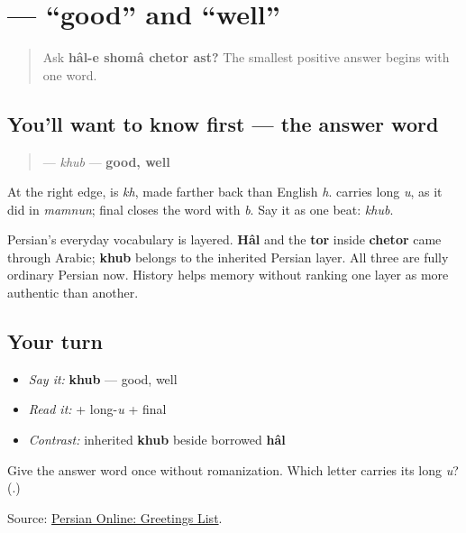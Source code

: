 \section[\texorpdfstring{\fa{خوب} (khub)}{خوب (khub)}]{ — “good” and “well”}

\label{lesson:FA-C04-khub}



\begin{quote}
Ask \textbf{hâl-e shomâ chetor ast?} The smallest positive answer begins with one word.
\end{quote}

\subsection*{You'll want to know first — the answer word}
\begin{quote}
\textbf{} — \emph{khub} — \textbf{good, well}
\end{quote}

At the right edge, \textbf{} is \emph{kh}, made farther back than English \emph{h}. \textbf{} carries long \emph{u}, as it did in \emph{mamnun}; final \textbf{} closes the word with \emph{b}. Say it as one beat: \emph{khub}.

\begin{cousinweb}
Persian's everyday vocabulary is layered. \textbf{Hâl} and the \textbf{tor} inside \textbf{chetor} came through Arabic; \textbf{khub} belongs to the inherited Persian layer. All three are fully ordinary Persian now. History helps memory without ranking one layer as more authentic than another.
\end{cousinweb}

\subsection*{Your turn}
\begin{itemize}
\raggedright
  \item \emph{Say it:} \textbf{khub} — good, well
  \item \emph{Read it:} \textbf{} + long-\emph{u} \textbf{} + final \textbf{}
  \item \emph{Contrast:} inherited \textbf{khub} beside borrowed \textbf{hâl}
\end{itemize}

\begin{tcolorbox}[breakable,colback=teal!4,colframe=teal!35!black,title={Before you move on}]
Give the answer word once without romanization. Which letter carries its long \emph{u}? (\textbf{}.)

Source: \href{https://sites.la.utexas.edu/persian\_online\_resources/vocabulary-lists/meetings-introductions/}{Persian Online: Greetings List}.
\end{tcolorbox}
